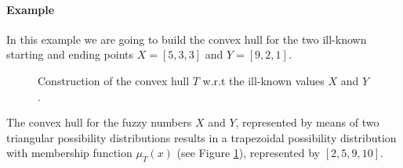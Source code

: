 \documentclass[twoside,twocolumn,a4paper]{article}
\newcommand{\Pos}{\operatorname{Pos}}
\newcommand{\Nec}{\operatorname{Nec}}
\begin{document}






\paragraph{Example}
In this example we are going to build the convex hull for the two ill-known starting and ending points $X= \left[5, 3, 3\right]$ and $Y = \left[9, 2, 1\right]$.


\begin{figure}[h!]
  \centering
 
  \caption{Construction of the convex hull $T$ w.r.t the ill-known values $X$ and $Y$.}
  \label{fig:convex-hull-T}
\end{figure}


The convex hull for the fuzzy numbers $X$ and $Y$, represented by means of two triangular possibility distributions results in a trapezoidal possibility distribution with membership function $\mu_T(x)$ (see Figure \ref{fig:convex-hull-T}), represented by $[2,5,9,10]$.
\end{document}
